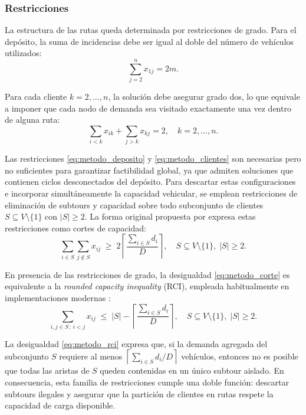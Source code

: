 \subsubsection{Restricciones}

La estructura de las rutas queda determinada por restricciones de grado. Para el
depósito, la suma de incidencias debe ser igual al doble del número de vehículos
utilizados:
\begin{equation}
    \sum_{j=2}^{n} x_{1j} = 2m.
    \label{eq:metodo_deposito}
\end{equation}

Para cada cliente $k=2,\dots,n$, la solución debe asegurar grado dos, lo que equivale
a imponer que cada nodo de demanda sea visitado exactamente una vez dentro de alguna
ruta:
\begin{equation}
    \sum_{i<k} x_{ik} + \sum_{j>k} x_{kj} = 2,
    \quad k=2,\dots,n.
    \label{eq:metodo_clientes}
\end{equation}

Las restricciones \eqref{eq:metodo_deposito} y \eqref{eq:metodo_clientes} son
necesarias pero no suficientes para garantizar factibilidad global, ya que admiten
soluciones que contienen ciclos desconectados del depósito. Para descartar estas
configuraciones e incorporar simultáneamente la capacidad vehicular, se emplean
restricciones de eliminación de subtours y capacidad sobre todo subconjunto de
clientes $S \subseteq V \setminus \{1\}$ con $|S| \ge 2$. La forma original propuesta
por \textcite{laporte1983branch} expresa estas restricciones como cortes de capacidad:
\begin{equation}
    \sum_{i \in S} \sum_{j \notin S} x_{ij} \;\ge\; 2 \left\lceil
        \frac{\sum_{i \in S} d_i}{D}
    \right\rceil,
    \quad S \subseteq V \setminus \{1\},\; |S| \ge 2.
    \label{eq:metodo_corte}
\end{equation}

En presencia de las restricciones de grado, la desigualdad
\eqref{eq:metodo_corte} es equivalente a la \textit{rounded capacity inequality} (RCI),
empleada habitualmente en implementaciones modernas
\parencite{lysgaard2004branch}:
\begin{equation}
    \sum_{i,j \in S\,;\, i<j} x_{ij}
    \;\le\; |S| - \left\lceil
        \frac{\sum_{i \in S} d_i}{D}
    \right\rceil,
    \quad S \subseteq V \setminus \{1\},\; |S| \ge 2.
    \label{eq:metodo_rci}
\end{equation}

La desigualdad \eqref{eq:metodo_rci} expresa que, si la demanda agregada del
subconjunto $S$ requiere al menos $\left\lceil \sum_{i \in S} d_i / D \right\rceil$
vehículos, entonces no es posible que todas las aristas de $S$ queden contenidas en un
único subtour aislado. En consecuencia, esta familia de restricciones cumple una
doble función: descartar subtours ilegales y asegurar que la partición de clientes en
rutas respete la capacidad de carga disponible.


